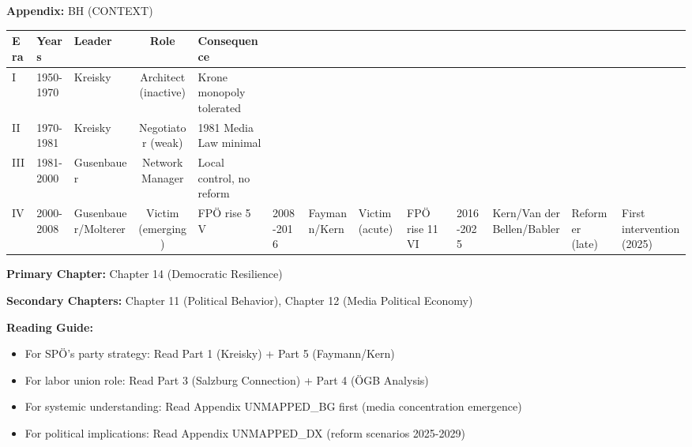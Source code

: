 
\begin{tcolorbox}[colback=yellow!5!white, colframe=yellow!75!black,
    title=Quick Reference: SPÖ's Six Eras in Media Politics]
\textbf{Appendix:} BH (CONTEXT)


\begin{tabular}{@{}lllcl@{}}
\textbf{Era} & \textbf{Years} & \textbf{Leader} & \textbf{Role} & \textbf{Consequence} \\
\midrule
I & 1950-1970 & Kreisky & Architect (inactive) & Krone monopoly tolerated \\
II & 1970-1981 & Kreisky & Negotiator (weak) & 1981 Media Law minimal \\
III & 1981-2000 & Gusenbauer & Network Manager & Local control, no reform \\
IV & 2000-2008 & Gusenbauer/Molterer & Victim (emerging) & FPÖ rise 5%
V & 2008-2016 & Faymann/Kern & Victim (acute) & FPÖ rise 11%
VI & 2016-2025 & Kern/Van der Bellen/Babler & Reformer (late) & First intervention (2025) \\
\end{tabular}

\end{tcolorbox}


\begin{tcolorbox}[colback=purple!5!white, colframe=purple!75!black,
    title=Chapter Linkage]

\textbf{Primary Chapter:} Chapter 14 (Democratic Resilience)

\textbf{Secondary Chapters:} Chapter 11 (Political Behavior), Chapter 12 (Media Political Economy)

\textbf{Reading Guide:}
\begin{itemize}[nosep]
\item For SPÖ's party strategy: Read Part 1 (Kreisky) + Part 5 (Faymann/Kern)
\item For labor union role: Read Part 3 (Salzburg Connection) + Part 4 (ÖGB Analysis)
\item For systemic understanding: Read Appendix UNMAPPED_BG first (media concentration emergence)
\item For political implications: Read Appendix UNMAPPED_DX (reform scenarios 2025-2029)
\end{itemize}

\end{tcolorbox}

